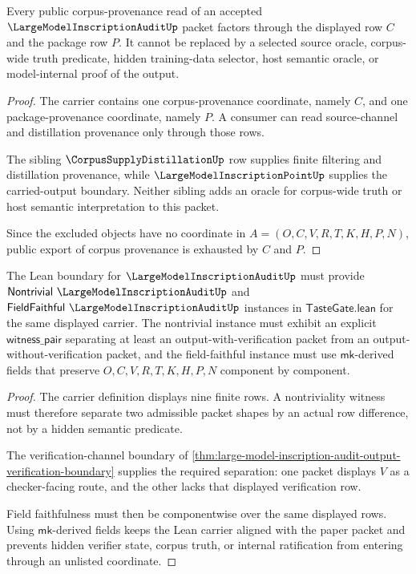 \begin{theorem}
\label{thm:large-model-inscription-audit-corpus-provenance-nonescape}
Every public corpus-provenance read of an accepted $\LargeModelInscriptionAuditUp$ packet factors through the displayed row $C$ and the package row $P$. It cannot be replaced by a selected source oracle, corpus-wide truth predicate, hidden training-data selector, host semantic oracle, or model-internal proof of the output.
\end{theorem}
\begin{proof}
The carrier contains one corpus-provenance coordinate, namely $C$, and one package-provenance coordinate, namely $P$. A consumer can read source-channel and distillation provenance only through those rows.

The sibling $\CorpusSupplyDistillationUp$ row supplies finite filtering and distillation provenance, while $\LargeModelInscriptionPointUp$ supplies the carried-output boundary. Neither sibling adds an oracle for corpus-wide truth or host semantic interpretation to this packet.

Since the excluded objects have no coordinate in $A=(O,C,V,R,T,K,H,P,N)$, public export of corpus provenance is exhausted by $C$ and $P$.
\end{proof}

\begin{theorem}
\label{thm:large-model-inscription-audit-tastegate-obligation}
The Lean boundary for $\LargeModelInscriptionAuditUp$ must provide $\mathsf{Nontrivial}\ \LargeModelInscriptionAuditUp$ and $\mathsf{FieldFaithful}\ \LargeModelInscriptionAuditUp$ instances in $\mathsf{TasteGate.lean}$ for the same displayed carrier. The nontrivial instance must exhibit an explicit $\mathsf{witness\_pair}$ separating at least an output-with-verification packet from an output-without-verification packet, and the field-faithful instance must use $\mathsf{mk}$-derived fields that preserve $O,C,V,R,T,K,H,P,N$ component by component.
\end{theorem}
\begin{proof}
The carrier definition displays nine finite rows. A nontriviality witness must therefore separate two admissible packet shapes by an actual row difference, not by a hidden semantic predicate.

The verification-channel boundary of \autoref{thm:large-model-inscription-audit-output-verification-boundary} supplies the required separation: one packet displays $V$ as a checker-facing route, and the other lacks that displayed verification row.

Field faithfulness must then be componentwise over the same displayed rows. Using $\mathsf{mk}$-derived fields keeps the Lean carrier aligned with the paper packet and prevents hidden verifier state, corpus truth, or internal ratification from entering through an unlisted coordinate.
\end{proof}

